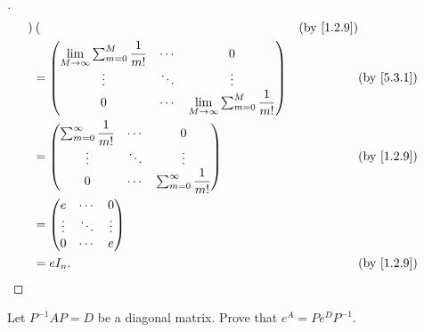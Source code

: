 \begin{proof}[]
\begin{align*}
\begin{pmatrix}
                                    \end{pmatrix}                                        &  & \by{1.2.9}                                      \\
            & = \begin{pmatrix}
                  \Lim_{M \to \infty} \sum_{m = 0}^M  \dfrac{1}{m!} & \cdots & 0                                               \\
                  \vdots                                            & \ddots & \vdots                                          \\
                  0                                                 & \cdots & \Lim_{M \to \infty}\sum_{m = 0}^M \dfrac{1}{m!}
                \end{pmatrix} &  & \by{5.3.1}                   \\
            & = \begin{pmatrix}
                  \sum_{m = 0}^\infty \dfrac{1}{m!} & \cdots & 0                                 \\
                  \vdots                            & \ddots & \vdots                            \\
                  0                                 & \cdots & \sum_{m = 0}^\infty \dfrac{1}{m!}
                \end{pmatrix}                               &  & \by{1.2.9}                                                 \\
            & = \begin{pmatrix}
                  e      & \cdots & 0      \\
                  \vdots & \ddots & \vdots \\
                  0      & \cdots & e
                \end{pmatrix}                                                                                                       \\
            & = e I_n.                                                                                                        &  & \by{1.2.9}
  \end{align*}
\end{proof}

\begin{ex}\label{ex:5.3.21}
  Let \(P^{-1} A P = D\) be a diagonal matrix.
  Prove that \(e^A = P e^D P^{-1}\).
\end{ex}

